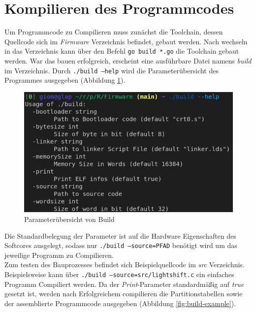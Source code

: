     \section{Kompilieren des Programmcodes}\label{lab:compile-code}
        Um Programmcode zu Compilieren muss zunächst die Toolchain,
        dessen Quellcode sich im \textit{Firmware} Verzeichnis befindet, gebaut werden.
        Nach wechseln in das Verzeichnis kann über den Befehl \texttt{go build *.go}
        die Toolchain gebaut werden. War das bauen erfolgreich, erscheint
        eine ausführbare Datei namens \textit{build} im Verzeichnis.
        Durch \texttt{./build --help} wird die Parameterübersicht des Programmes
        ausgegeben (Abbildung \ref{fig:build-help}).

        \begin{figure}[H]
            \centering
            \includegraphics[scale=1]{img/build_help.png}
            \caption{Parameterübersicht von Build}
            \label{fig:build-help}
        \end{figure}
        Die Standardbelegung der Parameter ist auf die Hardware Eigenschaften des
        Softcores ausgelegt, sodass nur \texttt{./build --source=PFAD} benötigt wird
        um das jeweilige Programm zu Compilieren.
        \\
        Zum testen des Bauprozesses befindet sich Beispielquellcode im
        \textit{src} Verzeichnis.
        Beispielsweise kann über \texttt{./build --source=src/lightshift.c}
        ein einfaches Programm Compiliert werden. Da der \textit{Print}-Parameter
        standardmäßig auf \textit{true} gesetzt ist, werden nach Erfolgreichem
        compilieren die Partitionstabellen sowie der assemblierte Programmcode
        ausgegeben (Abbildung \ref{fig:build-example}).


